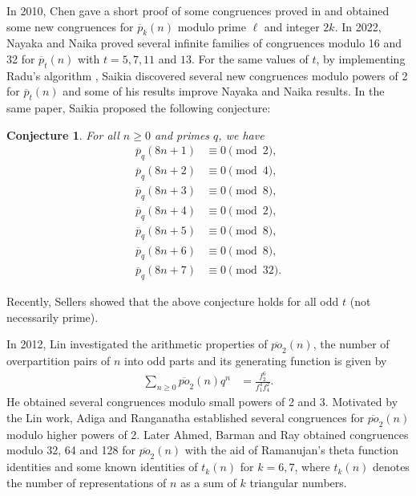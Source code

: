 \documentclass[12pt,reqno,a4paper]{amsart}
\newtheorem{conjecture}[theorem]{Conjecture}
\numberwithin{equation}{section}
\begin{document}
In 2010, Chen  \cite{chen2} gave a short proof of some congruences proved in \cite{keister} and obtained some new congruences for $\overline{p}_k(n)$ modulo prime $\ell$ and integer $2k$. In 2022, Nayaka and Naika \cite{nayaka2022congruences} proved several infinite families of congruences modulo 16 and 32 for $\overline{p}_{t}(n)$ with $t=5, 7, 11$ and $13$. For the same values of  $t$, by implementing Radu’s algorithm \cite{radu2015algorithmic}, Saikia \cite{saikia}  discovered several new congruences modulo powers of 2 for $\overline{p}_{t}(n)$ and some of his results improve  Nayaka and Naika \cite{nayaka2022congruences} results. In the same paper, Saikia \cite{saikia} proposed the following conjecture:
\begin{conjecture}\label{Con}
    For all $n\geq 0$ and primes $q$, we have
    \begin{align}
 \label{E1}   \overline{p}_{q}(8n+1)& \equiv 0 \pmod{2},\\
\label{E2} \overline{p}_{q}(8n+2)& \equiv 0 \pmod{4},\\
\label{E3}   \overline{p}_{q}(8n+3)& \equiv 0 \pmod{8},\\
\label{E4}  \overline{p}_{q}(8n+4)& \equiv 0 \pmod{2},\\
 \label{E5} \overline{p}_{q}(8n+5)& \equiv 0 \pmod{8},\\
\label{E6}  \overline{p}_{q}(8n+6)& \equiv 0 \pmod{8},\\ 
\label{E7} \overline{p}_{q}(8n+7)& \equiv 0 \pmod{32}.
    \end{align}
\end{conjecture}
Recently, Sellers \cite{sellers2024elementary} showed that the above conjecture holds for all odd $t$ (not necessarily prime).


In 2012, Lin \cite{Lin}  investigated the arithmetic properties of $\overline{po}_2(n)$, the number of overpartition pairs of $n$ into odd parts and its generating function is given by
\begin{align*}
    \sum_{n\geq 0}\overline{po}_2(n)q^n&= \frac{f_2^6}{f_1^4f_4^2}.
\end{align*}
He obtained several congruences modulo small powers of 2 and 3. Motivated by the Lin \cite{Lin} work,  Adiga and Ranganatha \cite{AdiRan} established several congruences for $\overline{po}_2(n)$ modulo higher powers of 2. Later Ahmed, Barman and Ray \cite{ABR} obtained congruences modulo 32, 64 and 128 for $\overline{po}_2(n)$ with the aid of Ramanujan’s theta function identities and some known identities of $t_k(n)$ for $k= 6, 7$, where $t_k(n)$ denotes the number of representations of $n$ as a sum of $k$ triangular numbers. \\
\end{document}
